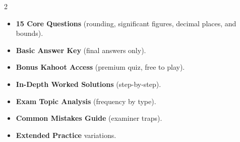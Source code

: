 \documentclass[11pt,a4paper]{article}
\newcommand{\FullReleaseDate}{April 30, 2026}
\begin{document}
\vspace{8pt}

\begin{multicols}{2}
  \begin{tcolorbox}[card, title=\sffamily\bfseries\textcolor{white}{\faHandPointDown\ TODAY (Simplified Version)}, colbacktitle=mainblue, boxed title style={sharp corners, boxrule=0pt}]
    \begin{itemize}[leftmargin=1.2em, itemsep=2pt]
      \item \small \textbf{15 Core Questions} (rounding, significant figures, decimal places, and bounds).
      \item \small \textbf{Basic Answer Key} (final answers only).
      \item \small \textbf{Bonus Kahoot Access} (premium quiz, free to play).
    \end{itemize}
  \end{tcolorbox}

  \columnbreak

  \begin{tcolorbox}[card, title=\sffamily\bfseries\textcolor{white}{\faRocket\ ON \FullReleaseDate\ (Full Upgrade)}, colbacktitle=mainblue, boxed title style={sharp corners, boxrule=0pt}]
    \begin{itemize}[leftmargin=1.2em, itemsep=2pt]
      \item \small \textbf{In-Depth Worked Solutions} (step-by-step).
      \item \small \textbf{Exam Topic Analysis} (frequency by type).
      \item \small \textbf{Common Mistakes Guide} (examiner traps).
      \item \small \textbf{Extended Practice} variations.
    \end{itemize}
  \end{tcolorbox}
\end{multicols}
\end{document}
